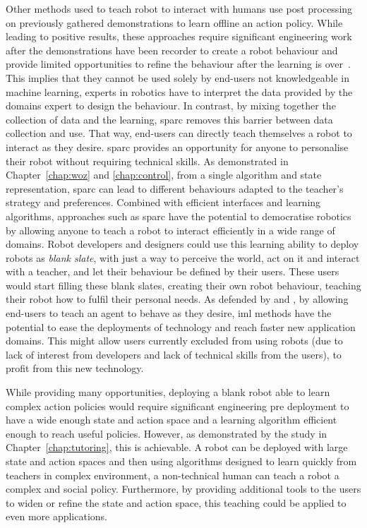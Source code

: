 Other methods used to teach robot to interact with humans use post processing on previously gathered demonstrations to learn offline an action policy. While leading to positive results, these approaches require significant engineering work after the demonstrations have been recorder to create a robot behaviour and provide limited opportunities to refine the behaviour after the learning is over~\citep{liu2014train,sequeira2016discovering}. This implies that they cannot be used solely by end-users not knowledgeable in machine learning, experts in robotics have to interpret the data provided by the domains expert to design the behaviour. In contrast, by mixing together the collection of data and the learning, \gls{sparc} removes this barrier between data collection and use. That way, end-users can directly teach themselves a robot to interact as they desire.
\gls{sparc} provides an opportunity for anyone to personalise their robot without requiring technical skills. As demonstrated in Chapter~\ref{chap:woz} and \ref{chap:control}, from a single algorithm and state representation, \gls{sparc} can lead to different behaviours adapted to the teacher's strategy and preferences. Combined with efficient interfaces and learning algorithms, approaches such as \gls{sparc} have the potential to democratise robotics by allowing anyone to teach a robot to interact efficiently in a wide range of domains. Robot developers and designers could use this learning ability to deploy robots as \emph{blank slate}, with just a way to perceive the world, act on it and interact with a teacher, and let their behaviour be defined by their users. These users would start filling these blank slates, creating their own robot behaviour, teaching their robot how to fulfil their personal needs. As defended by \cite{fails2003interactive} and \cite{amershi2014power}, by allowing end-users to teach an agent to behave as they desire, \gls{iml} methods have the potential to ease the deployments of technology and reach faster new application domains. This might allow users currently excluded from using robots (due to lack of interest from developers and lack of technical skills from the users), to profit from this new technology.

While providing many opportunities, deploying a blank robot able to learn complex action policies would require significant engineering pre deployment to have a wide enough state and action space and a learning algorithm efficient enough to reach useful policies. However, as demonstrated by the study in Chapter~\ref{chap:tutoring}, this is achievable. A robot can be deployed with large state and action spaces and then using algorithms designed to learn quickly from teachers in complex environment, a non-technical human can teach a robot a complex and social policy. Furthermore, by providing additional tools to the users to widen or refine the state and action space, this teaching could be applied to even more applications.

